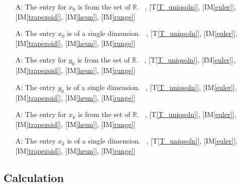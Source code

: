 \documentclass[12pt]{article}
\newcommand{\tref}[1]{T\ref{#1}}
\newcounter{assumpnum} %
\newcommand{\iref}[1]{IM\ref{#1}}
\begin{document}
\begin{itemize}
\item[A\refstepcounter{assumpnum}\theassumpnum \label{A_entriesofx0}:]
The entry for $x_0$ is from the set of $\mathbb{R}$.
~\newline
[\tref{T_ODE}], [\tref{T_uniqsoln}],
[\iref{euler}], [\iref{trapezoid}], [\iref{heun}], [\iref{runge}]

\item[A\refstepcounter{assumpnum}\theassumpnum \label{A_dimofx0}:]
The entry $x_0$ is of a single dimension.
~\newline
[\tref{T_ODE}], [\tref{T_uniqsoln}],
[\iref{euler}], [\iref{trapezoid}], [\iref{heun}], [\iref{runge}]

\item[A\refstepcounter{assumpnum}\theassumpnum \label{A_entriesofy0}:]
The entry for $y_0$ is from the set of $\mathbb{R}$.
~\newline
[\tref{T_ODE}], [\tref{T_uniqsoln}],
[\iref{euler}], [\iref{trapezoid}], [\iref{heun}], [\iref{runge}]

\item[A\refstepcounter{assumpnum}\theassumpnum \label{A_dimofy0}:]
The entry $y_0$ is of a single dimension.
~\newline
[\tref{T_ODE}], [\tref{T_uniqsoln}],
[\iref{euler}], [\iref{trapezoid}], [\iref{heun}], [\iref{runge}]

\item[A\refstepcounter{assumpnum}\theassumpnum \label{A_entriesofxk}:]
The entry for $x_k$ is from the set of $\mathbb{R}$.
~\newline
[\tref{T_ODE}], [\tref{T_uniqsoln}],
[\iref{euler}], [\iref{trapezoid}], [\iref{heun}], [\iref{runge}]

\item[A\refstepcounter{assumpnum}\theassumpnum \label{A_dimofxk}:]
The entry $x_k$ is of a single dimension.
~\newline
[\tref{T_ODE}], [\tref{T_uniqsoln}],
[\iref{euler}], [\iref{trapezoid}], [\iref{heun}], [\iref{runge}]

\end{itemize}

\subsection{Calculation} \label{sec_Calculation}
\end{document}
